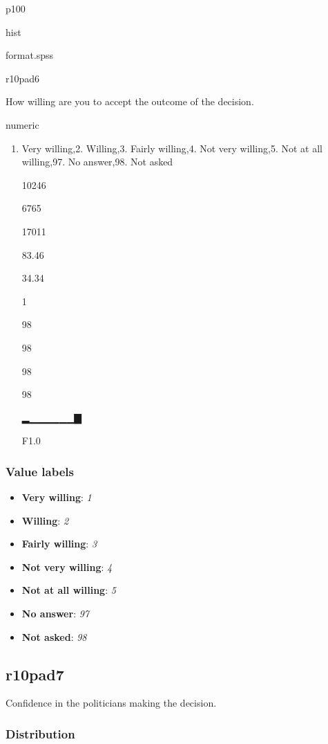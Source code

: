 \documentclass[]{book}
\providecommand{\tightlist}{%
  \setlength{\itemsep}{0pt}\setlength{\parskip}{0pt}}
\begin{document}
p100

hist

format.spss

r10pad6

How willing are you to accept the outcome of the decision.

numeric

\begin{enumerate}
\def\labelenumi{\arabic{enumi}.}
\tightlist
\item
  Very willing,2. Willing,3. Fairly willing,4. Not very willing,5. Not
  at all willing,97. No answer,98. Not asked

  10246

  6765

  17011

  83.46

  34.34

  1

  98

  98

  98

  98

  ▂▁▁▁▁▁▁▇

  F1.0
\end{enumerate}

\subsubsection{Value labels}\label{r10pad6_labels}

\begin{itemize}
\tightlist
\item
  \textbf{Very willing}: \emph{1}
\item
  \textbf{Willing}: \emph{2}
\item
  \textbf{Fairly willing}: \emph{3}
\item
  \textbf{Not very willing}: \emph{4}
\item
  \textbf{Not at all willing}: \emph{5}
\item
  \textbf{No answer}: \emph{97}
\item
  \textbf{Not asked}: \emph{98}
\end{itemize}

\subsection{r10pad7}\label{r10pad7}

Confidence in the politicians making the decision.

\subsubsection{Distribution}\label{r10pad7_distribution}
\end{document}
